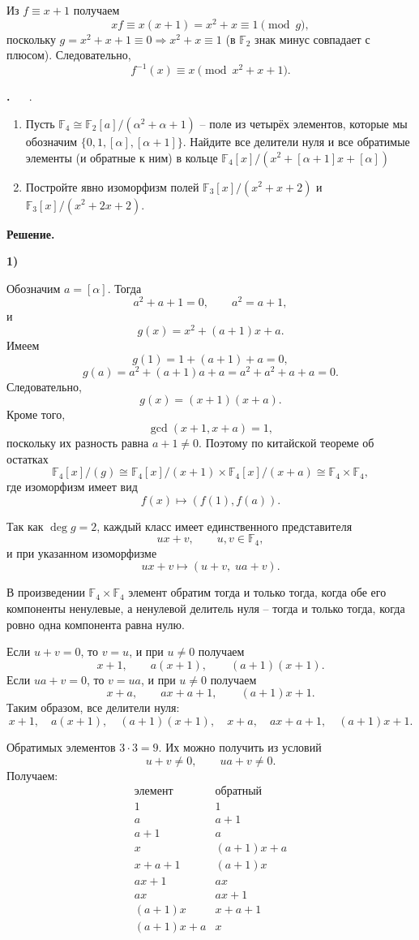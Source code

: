 \documentclass[12pt,a4paper]{article}
\newcounter{task}                   %
\newenvironment{task}[1][]{%
  \refstepcounter{task}%
  \par\vspace{0.3\baselineskip}%
  \noindent\textbf{\thetask.}%
  \if\relax\detokenize{#1}\relax   %
    \ \ignorespaces                 %
  \else
    \ \textbf{#1}.\ \ignorespaces   %
  \fi
}{%
  \par\vspace{0.2\baselineskip}%
}
\newcommand{\sol}{%
  \par\vspace{0.3\baselineskip}%
  \noindent\textbf{Решение.}\ %
  \ignorespaces                     %
}
\newcommand{\soli}[1]{%
  \par\vspace{0.15\baselineskip}%
  \noindent\textbf{#1)}\ %
  \ignorespaces                     %
}
\begin{document}
Из $f \equiv x+1$ получаем
\[
x f \equiv x(x+1) = x^2+x \equiv 1 \pmod{g},
\]
поскольку $g = x^2+x+1 \equiv 0 \Rightarrow x^2+x \equiv 1$ (в $\mathbb{F}_2$ знак минус совпадает с плюсом). Следовательно,
\[
\boxed{f^{-1}(x) \equiv x \pmod{x^2+x+1}}.
\]

\newpage 


\begin{task}
    \begin{enumerate}
	\item Пусть $\mathbb{F}_4 \cong \mathbb{F}_2[a]/(\alpha^2 + \alpha + 1)$ -- поле из четырёх элементов, которые мы обозначим $\{0, 1, [\alpha], [\alpha + 1]\}$. Найдите все делители нуля и все обратимые элементы (и обратные к ним) в кольце $\mathbb{F}_4[x] / (x^2 + [\alpha + 1]x + [\alpha])$
	\item Постройте явно изоморфизм полей $\mathbb{F}_3[x]/(x^2 + x + 2)$ и $\mathbb{F}_3[x]/(x^2 + 2x + 2)$.
    \end{enumerate}
\end{task}

\sol
\soli{1}

Обозначим $a=[\alpha]$. Тогда
\[
a^2+a+1=0,\qquad a^2=a+1,
\]
и
\[
g(x)=x^2+(a+1)x+a.
\]
Имеем
\[
g(1)=1+(a+1)+a=0,
\]
\[
g(a)=a^2+(a+1)a+a=a^2+a^2+a+a=0.
\]
Следовательно,
\[
g(x)=(x+1)(x+a).
\]
Кроме того,
\[
\gcd(x+1,x+a)=1,
\]
поскольку их разность равна $a+1\ne0$. Поэтому по китайской теореме об остатках
\[
\mathbb{F}_4[x]/(g)
\cong
\mathbb{F}_4[x]/(x+1)\times\mathbb{F}_4[x]/(x+a)
\cong\mathbb{F}_4\times\mathbb{F}_4,
\]
где изоморфизм имеет вид
\[
f(x)\longmapsto(f(1),f(a)).
\]

Так как $\deg g=2$, каждый класс имеет единственного представителя
\[
ux+v,\qquad u,v\in\mathbb{F}_4,
\]
и при указанном изоморфизме
\[
ux+v\longmapsto(u+v,\;ua+v).
\]

В произведении $\mathbb{F}_4\times\mathbb{F}_4$ элемент обратим тогда и только тогда, когда обе его компоненты ненулевые, а ненулевой делитель нуля -- тогда и только тогда, когда ровно одна компонента равна нулю.

Если $u+v=0$, то $v=u$, и при $u\ne0$ получаем
\[
x+1,\qquad a(x+1),\qquad (a+1)(x+1).
\]
Если $ua+v=0$, то $v=ua$, и при $u\ne0$ получаем
\[
x+a,\qquad ax+a+1,\qquad (a+1)x+1.
\]
Таким образом, все делители нуля:
\[
\boxed{
x+1,\quad a(x+1),\quad (a+1)(x+1),\quad
x+a,\quad ax+a+1,\quad (a+1)x+1
}.
\]

Обратимых элементов $3\cdot3=9$. Их можно получить из условий
\[
u+v\ne0,\qquad ua+v\ne0.
\]
Получаем:
\[
\begin{array}{c|c}
\text{элемент} & \text{обратный} \\ \hline
1 & 1 \\
a & a+1 \\
a+1 & a \\
x & (a+1)x+a \\
x+a+1 & (a+1)x \\
ax+1 & ax \\
ax & ax+1 \\
(a+1)x & x+a+1 \\
(a+1)x+a & x
\end{array}
\]
\end{document}
